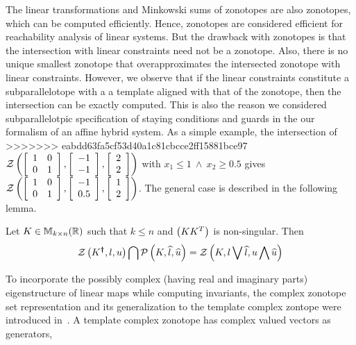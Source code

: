 The linear transformations and Minkowski sums of zonotopes are also
zonotopes, which can be computed efficiently.  Hence, zonotopes are
considered efficient for reachability analysis of linear systems.  But
the drawback with zonotopes is that the intersection with linear
constraints need not be a zonotope.  Also, there is no unique smallest
zonotope that overapproximates the intersected zonotope with linear
constraints.  However, we observe that if the linear constraints
constitute a subparallelotope with a a template aligned with that of
the zonotope, then the intersection can be exactly computed.  This is
also the reason we considered subparallelotpic
specification of staying conditions and guards in the our formalism of
an affine hybrid system.  As a simple example, the intersection of
>>>>>>> eabdd63fa5cf53d40a1c81cbcce2ff15881bce97
$\mathcal{Z}\left(\left[\begin{array}{l l}1 & 0 \\ 0 &
      1\end{array}\right],\left[\begin{array}{c}-1\\ -1\end{array}\right],\left[\begin{array}{c}2\\ 2\end{array}\right]\right)$
with $x_1\leq 1~\wedge~x_2\geq 0.5$ gives $\mathcal{Z}\left(\left[\begin{array}{l
        l}1 & 0 \\ 0 &
      1\end{array}\right],\left[\begin{array}{c}-1\\ 0.5\end{array}\right],\left[\begin{array}{c}1\\ 2\end{array}\right]\right)$.
The general case is described in the following lemma.
%
\begin{lemma}\label{lem:motivation}
Let $K\in\mathbb{M}_{k\times n}(\mathbb{R})$ such that $k\leq n$ and $\left(KK^T\right)$ is
non-singular.  Then
\[
\mathcal{Z}\left(K^{\bm{\dagger}},l,u\right) \bigcap \mathcal{P}\left(K,\widehat{l},\widehat{u}\right)
= \mathcal{Z}\left(K,l\bigvee \widehat{l},u\bigwedge \widehat{u}\right)
\]
\end{lemma}
%
To incorporate the possibly complex (having real and imaginary parts)
eigenstructure of linear maps while computing invariants, the complex
zonotope set representation and its generalization to the template
complex zontope were introduced in~\cite{adimoolam2016using,tcz2017}.
A template complex zonotope has complex valued vectors as generators,

